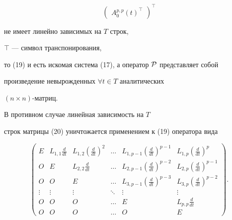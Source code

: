 \begin{pf}
\begin{equation}
\begin{pmatrix}
{A_0^{p,p}(t)}^\top


\end{pmatrix}^\top


\end{equation}


не имеет линейно зависимых на $T$ строк, 


$\top$ --- символ транспонирования,


то (19) и есть искомая система (17), а оператор $\cal P$ представляет собой


произведение невырожденных $\forall t \in T$ аналитических


$(n \times n)$-матриц.





В противном случае линейная зависимость на $T$


строк матрицы (20) уничтожается применением к (19) оператора вида


\begin{equation}


\begin{pmatrix}


E & L_{1,1} \frac{d}{dt} & L_{1,2} \left( \frac{d}{dt}\right)^2 & \dotsc &


L_{1,p-1} \left( \frac{d}{dt}\right)^{p-1} &


L_{1,p} \left( \frac{d}{dt}\right)^p\\


O & E & L_{2,2} \frac{d}{dt} & \dotsc &


L_{2,p-1} \left( \frac{d}{dt}\right)^{p-2}


& L_{2,p} \left( \frac{d}{dt}\right)^{p-1} \\


O & O & E & \dotsc &


L_{3,p-1} \left( \frac{d}{dt}\right)^{p-3} &


L_{3,p} \left( \frac{d}{dt}\right)^{p-2} \\


\vdots & \vdots & \vdots & \ddots & \vdots & \vdots \\


O & O & O & \dotsc & E & L_{p,p} \frac{d}{dt} \\


O & O & O & \dotsc & O & E


\end{pmatrix}.


\end{equation}






\end{pf}
